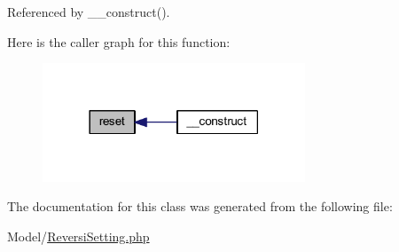 Referenced by \+\_\+\+\_\+construct().

Here is the caller graph for this function\+:\nopagebreak
\begin{figure}[H]
\begin{center}
\leavevmode
\includegraphics[width=222pt]{class_reversi_setting_a4a20559544fdf4dcb457e258dc976cf8_icgraph}
\end{center}
\end{figure}


The documentation for this class was generated from the following file\+:\begin{DoxyCompactItemize}
\item 
Model/\hyperlink{_reversi_setting_8php}{Reversi\+Setting.\+php}\end{DoxyCompactItemize}
